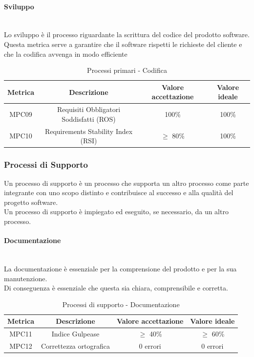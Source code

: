 \documentclass[10pt]{article}
\begin{document}
\begin{justify}
\paragraph{Sviluppo}\mbox{}\\
Lo sviluppo è il processo riguardante la scrittura del codice del prodotto software.\\
Questa metrica serve a garantire che il software rispetti le richieste del cliente e che la codifica avvenga in modo efficiente\\
\begin{table}[H]
  \centering
\begin{tabular}{|c|c|c|c|}
  \hline
  \textbf{Metrica} & \textbf{Descrizione} & \textbf{Valore accettazione} & \textbf{Valore ideale}\\
  \hline
  MPC09 & Requisiti Obbligatori Soddisfatti (ROS) & 100\% & 100\%\\
  \hline
  MPC10 & Requirements Stability Index (RSI) & $\geq$ 80\% & 100\% \\
  \hline
\end{tabular}
\caption{Processi primari - Codifica}
\label{tab:codifica}
\end{table}


\subsubsection{Processi di Supporto}
Un processo di supporto è un processo che supporta un altro processo come parte integrante con uno scopo distinto e contribuisce al successo e alla qualità del progetto software.\\
Un processo di supporto è impiegato ed eseguito, se necessario, da un altro processo.\\
\paragraph{Documentazione}\mbox{}\\
La documentazione è essenziale per la comprensione del prodotto e per la sua manutenzione.\\
Di conseguenza è essenziale che questa sia chiara, comprensibile e corretta.\\
\begin{table}[H]
  \centering
\begin{tabular}{|c|c|c|c|}
  \hline
  \textbf{Metrica} & \textbf{Descrizione} & \textbf{Valore accettazione} & \textbf{Valore ideale}\\
  \hline
  MPC11 & Indice Gulpease & $\geq$ 40\% & $\geq$ 60\% \\
  \hline
  MPC12 & Correttezza ortografica & 0 errori & 0 errori \\
  \hline
\end{tabular}
\caption{Processi di supporto - Documentazione}
\label{tab:documentazione}
\end{table}


\end{justify}
\end{document}
